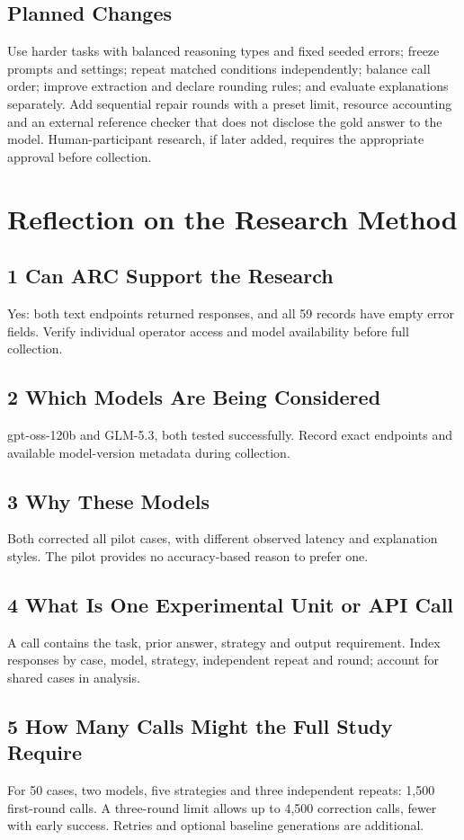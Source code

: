 \documentclass[11pt,letterpaper]{article}
\begin{document}
\subsection*{Planned Changes}
Use harder tasks with balanced reasoning types and fixed seeded errors; freeze prompts and settings; repeat matched conditions independently; balance call order; improve extraction and declare rounding rules; and evaluate explanations separately. Add sequential repair rounds with a preset limit, resource accounting and an external reference checker that does not disclose the gold answer to the model. Human-participant research, if later added, requires the appropriate approval before collection.

\clearpage
\section{Reflection on the Research Method}
\subsection*{1 Can ARC Support the Research}
Yes: both text endpoints returned responses, and all 59 records have empty error fields. Verify individual operator access and model availability before full collection.

\subsection*{2 Which Models Are Being Considered}
gpt-oss-120b and GLM-5.3, both tested successfully. Record exact endpoints and available model-version metadata during collection.

\subsection*{3 Why These Models}
Both corrected all pilot cases, with different observed latency and explanation styles. The pilot provides no accuracy-based reason to prefer one.

\subsection*{4 What Is One Experimental Unit or API Call}
A call contains the task, prior answer, strategy and output requirement. Index responses by case, model, strategy, independent repeat and round; account for shared cases in analysis.

\subsection*{5 How Many Calls Might the Full Study Require}
For 50 cases, two models, five strategies and three independent repeats: 1,500 first-round calls. A three-round limit allows up to 4,500 correction calls, fewer with early success. Retries and optional baseline generations are additional.
\end{document}
